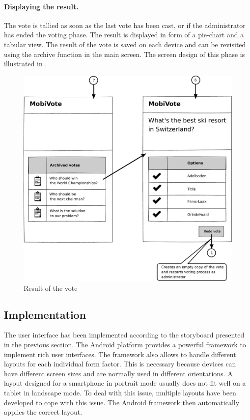 \documentclass[numbers=noenddot, abstract=on, a4paper, headsepline,
footsepline, oneside, openright, draft=off, listof=leveldown]{scrreprt}
\begin{document}
\paragraph{Displaying the result.}
The vote is tallied as soon as the last vote has been cast, or if the
administrator has ended the voting phase. The result is displayed in form of
a pie-chart and a tabular view. The result of the vote is saved on each device
and can be revisited using the archive function in the main screen. The screen
design of this phase is illustrated in .

\begin{figure}[htb]
	\centering
	\includegraphics[height=.3\textheight]{img/storyboard/result}
	\caption{Result of the vote}
	\label{fig:result}
\end{figure}


\subsection{Implementation}
The user interface has been implemented according to the storyboard presented in
the previous section. The Android platform provides a powerful framework to
implement rich user interfaces. The framework also allows to handle different
layouts for each individual form factor. This is necessary because devices can
have different screen sizes and are normally used in different orientations. A
layout designed for a smartphone in portrait mode usually does not fit well on a
tablet in landscape mode. To deal with this issue, multiple layouts have been
developed to cope with this issue. The Android framework then automatically
applies the correct layout.
\end{document}
